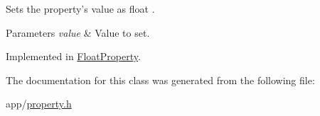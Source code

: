 Sets the property's value as float . 


\begin{DoxyParams}{Parameters}
{\em value} & Value to set. \\
\hline
\end{DoxyParams}


Implemented in \hyperlink{class_float_property_a24ef985394b6273da923cf0165620568}{Float\-Property}.



The documentation for this class was generated from the following file\-:\begin{DoxyCompactItemize}
\item 
app/\hyperlink{property_8h}{property.\-h}\end{DoxyCompactItemize}
